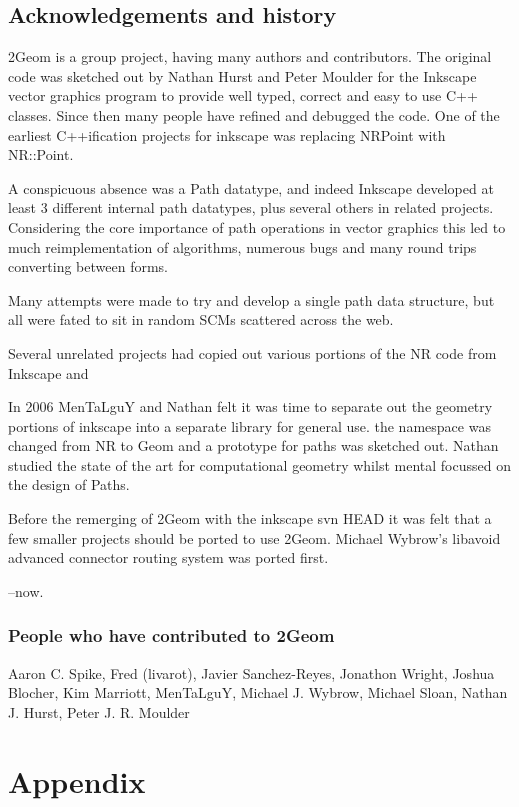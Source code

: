 \section{Acknowledgements and history}

2Geom is a group project, having many authors and contributors.  The
original code was sketched out by Nathan Hurst and Peter Moulder for
the Inkscape vector graphics program to provide well typed, correct
and easy to use C++ classes.  Since then many people have refined and
debugged the code.  One of the earliest C++ification projects for
inkscape was replacing NRPoint with NR::Point.

A conspicuous absence was a Path datatype, and indeed Inkscape
developed at least 3 different internal path datatypes, plus several
others in related projects.  Considering the core importance of path
operations in vector graphics this led to much reimplementation of
algorithms, numerous bugs and many round trips converting between
forms.

Many attempts were made to try and develop a single path data
structure, but all were fated to sit in random SCMs scattered across
the web.

Several unrelated projects had copied out various portions of the NR
code from Inkscape and 

In 2006 MenTaLguY and Nathan felt it was time to separate out
the geometry portions of inkscape into a separate library for general
use.  the namespace was changed from NR to Geom and a prototype for
paths was sketched out.  Nathan studied the state of the art for
computational geometry whilst mental focussed on the design of Paths.

Before the remerging of 2Geom with the inkscape svn HEAD it was felt
that a few smaller projects should be ported to use 2Geom.  Michael
Wybrow's libavoid advanced connector routing system was ported first.

--now.

\subsection{People who have contributed to 2Geom}

Aaron C. Spike,
Fred (livarot),
Javier Sanchez-Reyes,
Jonathon Wright,
Joshua Blocher,
Kim Marriott,
MenTaLguY,
Michael J. Wybrow,
Michael Sloan,
Nathan J. Hurst,
Peter J. R. Moulder

\chapter{Appendix}

